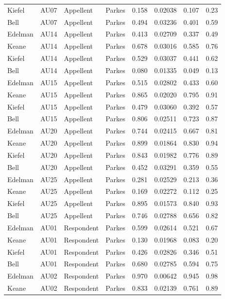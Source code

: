 \documentclass{monashthesis}
\begin{document}
\begin{center}
\begin{longtable}{llllllll}
Kiefel & AU07 & Appellent & Parkes & 0.158 & 0.02038 & 0.107 & 0.23 \\
Bell & AU07 & Appellent & Parkes & 0.494 & 0.03236 & 0.401 & 0.59 \\
Edelman & AU14 & Appellent & Parkes & 0.413 & 0.02709 & 0.337 & 0.49 \\
Keane & AU14 & Appellent & Parkes & 0.678 & 0.03016 & 0.585 & 0.76 \\
Kiefel & AU14 & Appellent & Parkes & 0.529 & 0.03037 & 0.441 & 0.62 \\
Bell & AU14 & Appellent & Parkes & 0.080 & 0.01335 & 0.049 & 0.13 \\
Edelman & AU15 & Appellent & Parkes & 0.515 & 0.02802 & 0.433 & 0.60 \\
Keane & AU15 & Appellent & Parkes & 0.865 & 0.02020 & 0.795 & 0.91 \\
Kiefel & AU15 & Appellent & Parkes & 0.479 & 0.03060 & 0.392 & 0.57 \\
Bell & AU15 & Appellent & Parkes & 0.806 & 0.02511 & 0.723 & 0.87 \\
Edelman & AU20 & Appellent & Parkes & 0.744 & 0.02415 & 0.667 & 0.81 \\
Keane & AU20 & Appellent & Parkes & 0.899 & 0.01864 & 0.830 & 0.94 \\
Kiefel & AU20 & Appellent & Parkes & 0.843 & 0.01982 & 0.776 & 0.89 \\
Bell & AU20 & Appellent & Parkes & 0.452 & 0.03291 & 0.359 & 0.55 \\
Edelman & AU25 & Appellent & Parkes & 0.281 & 0.02529 & 0.213 & 0.36 \\
Keane & AU25 & Appellent & Parkes & 0.169 & 0.02272 & 0.112 & 0.25 \\
Kiefel & AU25 & Appellent & Parkes & 0.895 & 0.01573 & 0.840 & 0.93 \\
Bell & AU25 & Appellent & Parkes & 0.746 & 0.02788 & 0.656 & 0.82 \\
Edelman & AU01 & Respondent & Parkes & 0.599 & 0.02614 & 0.521 & 0.67 \\
Keane & AU01 & Respondent & Parkes & 0.130 & 0.01968 & 0.083 & 0.20 \\
Kiefel & AU01 & Respondent & Parkes & 0.426 & 0.02826 & 0.346 & 0.51 \\
Bell & AU01 & Respondent & Parkes & 0.680 & 0.02785 & 0.594 & 0.75 \\
Edelman & AU02 & Respondent & Parkes & 0.970 & 0.00642 & 0.945 & 0.98 \\
Keane & AU02 & Respondent & Parkes & 0.833 & 0.02139 & 0.761 & 0.89 \\

\end{longtable}
\end{center}
\end{document}
